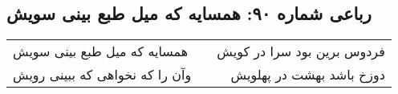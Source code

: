 \begin{center}
\section*{رباعی شماره ۹۰: همسایه که میل طبع بینی سویش}
\label{sec:090}
\begin{longtable}{l p{0.5cm} r}
همسایه که میل طبع بینی سویش
&&
فردوس برین بود سرا در کویش
\\
وآن را که نخواهی که ببینی رویش
&&
دوزخ باشد بهشت در پهلویش
\\
\end{longtable}
\end{center}
